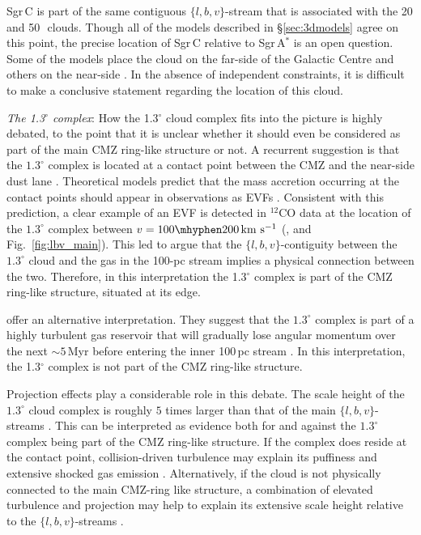 Sgr\,C is part of the same contiguous $\{l,b,v\}$-stream that is associated with the 20 and 50\,\kms \ clouds.
Though all of the models described in \S\ref{sec:3dmodels} agree on this point, the precise location of Sgr\,C relative to Sgr\,A$^{*}$ is an open question. 
Some of the models place the cloud on the far-side of the Galactic Centre \citep{Sofue1995a, Molinari2011} and others on the near-side \citep{Kruijssen2015, Ridley2017}. 
In the absence of independent constraints, it is difficult to make a conclusive statement regarding the location of this cloud. 
\medskip

\noindent\emph{The 1.3$^{\circ}$ complex}: How the 1.3$^{\circ}$ cloud complex fits into the picture is highly debated, to the point that it is unclear whether it should even be considered as part of the main CMZ ring-like structure or not. 
A recurrent suggestion is that the $1.3^{\circ}$ complex is located at a contact point between the CMZ and the near-side dust lane \citep[][see also \S\ref{sec:dustlanes}]{Huettemeister1998,Fux1999,Rodriguez-Fernandez2006,Sormani2019a}. Theoretical models predict that the mass accretion occurring at the contact points should appear in observations as EVFs \citep[\S\ref{sec:EVFs};][]{Fux1999,Sormani2019a}. 
Consistent with this prediction, a clear example of an EVF is detected in $^{12}$CO data at the location of the $1.3^\circ$ complex between $v=100\mhyphen 200 \, \kms$ (\citealt{Liszt2006,Sormani2019a}, and Fig.~\ref{fig:lbv_main}). 
This led \citet{Tress2020} to argue that the $\{l,b,v\}$-contiguity between the $1.3^{\circ}$ cloud and the gas in the 100-pc stream implies a physical connection between the two. 
Therefore, in this interpretation the 1.3$^{\circ}$ complex is part of the CMZ ring-like structure, situated at its edge.

\cite{Krumholz2015} offer an alternative interpretation.
They suggest that the $1.3^{\circ}$ complex is part of a highly turbulent gas reservoir that will gradually lose angular momentum over the next $\sim5$\,Myr before entering the inner 100\,pc stream \citep[in contrast to the faster and more violent accretion events implied by the EVF interpretation;][]{Sormani2019a}. 
In this interpretation, the 1.3$^{\circ}$ complex is not part of the CMZ ring-like structure.

Projection effects play a considerable role in this debate. 
The scale height of the $1.3^{\circ}$ cloud complex is roughly $5$ times larger than that of the main $\{l,b,v\}$-streams \citep{Rodriguez-Fernandez2008, Henshaw2016b}. 
This can be interpreted as evidence both for and against the $1.3^{\circ}$ complex being part of the CMZ ring-like structure.
If the complex does reside at the contact point, collision-driven turbulence may explain its puffiness and extensive shocked gas emission \citep{Huettemeister1998, Rodriguez-Fernandez2006, Tress2020}. 
Alternatively, if the cloud is not physically connected to the main CMZ-ring like structure, a combination of elevated turbulence and projection may help to explain its extensive scale height relative to the $\{l,b,v\}$-streams \citep{Krumholz2017}.
\\

